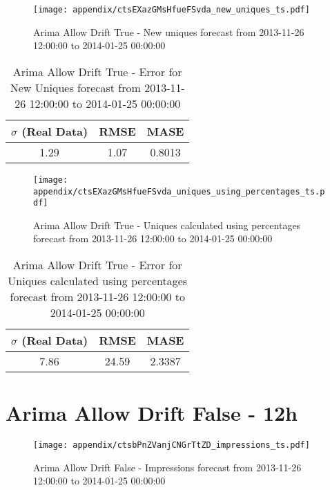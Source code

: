 \begin{figure}[H] \begin{center} \leavevmode
\texttt{[image: appendix/ctsEXazGMsHfueFSvda\_new\_uniques\_ts.pdf]} \caption{
Arima Allow Drift True - New uniques forecast from 2013-11-26 12:00:00 to 2014-01-25 00:00:00} \label{fig:appendix/ctsEXazGMsHfueFSvda_new_uniques_ts.pdf} \end{center}
\end{figure}

\begin{table}[H]
\centering
\footnotesize
\begin{tabular}{ccc}
$\sigma$ (Real Data) & RMSE & MASE   \\ \hline
1.29 & 1.07 & 0.8013 \\
\end{tabular}

\vspace{0.5cm}

\caption{
Arima Allow Drift True - Error for New Uniques forecast from 2013-11-26 12:00:00 to 2014-01-25 00:00:00}
\end{table}

\begin{figure}[H] \begin{center} \leavevmode
\texttt{[image: appendix/ctsEXazGMsHfueFSvda\_uniques\_using\_percentages\_ts.pdf]} \caption{
Arima Allow Drift True - Uniques calculated using percentages forecast from 2013-11-26 12:00:00 to 2014-01-25 00:00:00} \label{fig:appendix/ctsEXazGMsHfueFSvda_uniques_using_percentages_ts.pdf} \end{center}
\end{figure}

\begin{table}[H]
\centering
\footnotesize
\begin{tabular}{ccc}
$\sigma$ (Real Data) & RMSE & MASE   \\ \hline
7.86 & 24.59 & 2.3387 \\
\end{tabular}

\vspace{0.5cm}

\caption{
Arima Allow Drift True - Error for Uniques calculated using percentages forecast from 2013-11-26 12:00:00 to 2014-01-25 00:00:00}
\end{table}

\section{Arima Allow Drift False - 12h}
\begin{figure}[H] \begin{center} \leavevmode
\texttt{[image: appendix/ctsbPnZVanjCNGrTtZD\_impressions\_ts.pdf]} \caption{
Arima Allow Drift False - Impressions forecast from 2013-11-26 12:00:00 to 2014-01-25 00:00:00} \label{fig:appendix/ctsbPnZVanjCNGrTtZD_impressions_ts.pdf} \end{center}
\end{figure}

